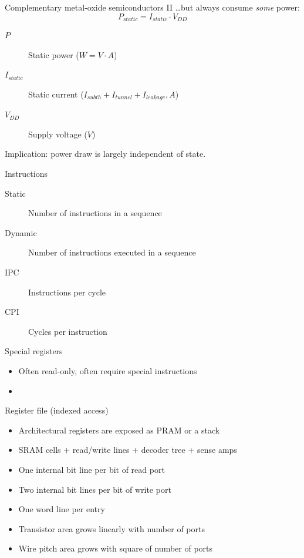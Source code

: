 \documentclass[xcolor={dvipsnames,table}]{beamer}
\begin{document}
\begin{frame}{Complementary metal-oxide semiconductors II}
\ldots but always consume \textit{some} power:
\begin{equation}
P_{static} = I_{static}\cdot V_{DD} \nonumber
\end{equation}
\begin{description}
\item[$P$] Static power ($W = V\cdot A$)
\item[$I_{static}$] Static current ($I_{subth} + I_{tunnel} + I_{leakage}, A$)
\item[$V_{DD}$] Supply voltage ($V$)
\end{description}
\vfill
Implication: power draw is largely independent of state.
\end{frame}

\begin{frame}{Instructions}
\begin{description}
\item[Static] Number of instructions in a sequence
\item[Dynamic] Number of instructions executed in a sequence
\item[IPC] Instructions per cycle
\item[CPI] Cycles per instruction
\end{description}
\end{frame}

\begin{frame}{Special registers}
\begin{itemize}
\item Often read-only, often require special instructions
\item 
\end{itemize}
\end{frame}

\begin{frame}{Register file (indexed access)}
\begin{itemize}
\item Architectural registers are exposed as PRAM or a stack
\item SRAM cells + read/write lines + decoder tree + sense amps
\item One internal bit line per bit of read port
\item Two internal bit lines per bit of write port
\item One word line per entry
\item Transistor area grows linearly with number of ports
\item Wire pitch area grows with square of number of ports
\end{itemize}
\end{frame}
\end{document}
